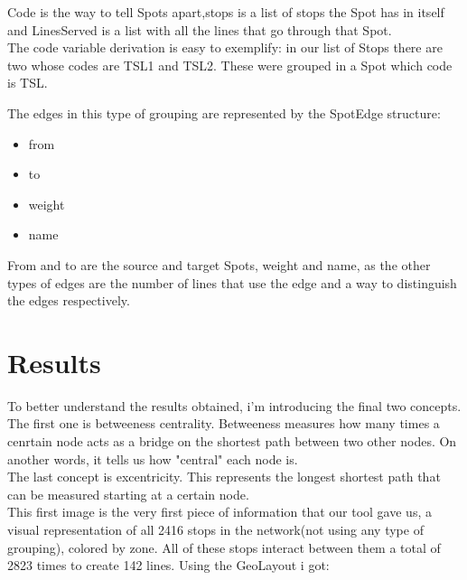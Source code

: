 \documentclass[12pt]{article}
\begin{document}
\begin{multicols}{2}
Code is the way to tell Spots apart,stops is a list of stops the Spot has in itself and LinesServed is a list with all the lines that go through that Spot.\\
The code variable derivation is easy to exemplify: in our list of Stops there are two whose codes are TSL1 and TSL2. These were grouped in a Spot which code is TSL.

The edges in this type of grouping are represented by the SpotEdge structure:
\begin{itemize}
\item from
\item to
\item weight
\item name
\end{itemize}

From and to are the source and target Spots, weight and name, as the other types of edges are the number of lines that use the edge and a way to distinguish the edges respectively.
	
\section{Results}
	To better understand the results obtained, i'm introducing the final two concepts.
	The first one is betweeness centrality. Betweeness measures how many times a cenrtain node acts as a bridge on the shortest path between two other nodes. On another words, it tells us how "central" each node is.\\
	The last concept is excentricity. This represents the longest shortest path that can be measured starting at a certain node.	\\
	This first image is the very first piece of information that our tool gave us, a visual representation of all 2416 stops in the network(not using any type of grouping), colored by zone. All of these stops interact between them a total of 2823 times to create 142 lines. Using the GeoLayout i got:\\


\end{multicols}
\end{document}
